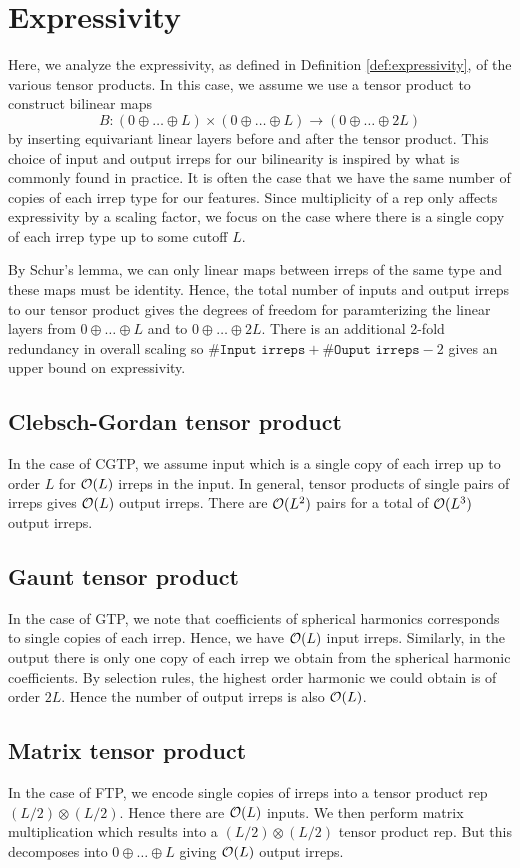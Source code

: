 \section{Expressivity}
\label{sec:expressivity}

Here, we analyze the expressivity, as defined in Definition \ref{def:expressivity}, of the various tensor products. In this case, we assume we use a tensor product to construct bilinear maps 
\[B:(0\oplus\ldots\oplus L)\times (0\oplus\ldots\oplus L)\to (0\oplus\ldots\oplus 2L)\]
by inserting equivariant linear layers before and after the tensor product. This choice of input and output irreps for our bilinearity is inspired by what is commonly found in practice. It is often the case that we have the same number of copies of each irrep type for our features. Since multiplicity of a rep only affects expressivity by a scaling factor, we focus on the case where there is a single copy of each irrep type up to some cutoff $L$.

By Schur's lemma, we can only linear maps between irreps of the same type and these maps must be identity. Hence, the total number of inputs and output irreps to our tensor product gives the degrees of freedom for paramterizing the linear layers from $0\oplus\ldots\oplus L$ and to $0\oplus\ldots\oplus 2L$. There is an additional 2-fold redundancy in overall scaling so $\texttt{\#Input irreps}+\texttt{\#Ouput irreps}-2$ gives an upper bound on expressivity.

\subsection{Clebsch-Gordan tensor product}

In the case of CGTP, we assume input which is a single copy of each irrep up to order $L$ for $\mathcal{O}(L)$ irreps in the input. In general, tensor products of single pairs of irreps gives $\mathcal{O}(L)$ output irreps. There are $\mathcal{O}(L^2)$ pairs for a total of $\mathcal{O}(L^3)$ output irreps.

\subsection{Gaunt tensor product}

In the case of GTP, we note that coefficients of spherical harmonics corresponds to single copies of each irrep. Hence, we have $\mathcal{O}(L)$ input irreps. Similarly, in the output there is only one copy of each irrep we obtain from the spherical harmonic coefficients. By selection rules, the highest order harmonic we could obtain is of order $2L$. Hence the number of output irreps is also $\mathcal{O}(L)$.

\subsection{Matrix tensor product}
In the case of FTP, we encode single copies of irreps into a tensor product rep $(L/2)\otimes (L/2)$. Hence there are $\mathcal{O}(L)$ inputs. We then perform matrix multiplication which results into a $(L/2)\otimes(L/2)$ tensor product rep. But this decomposes into $0\oplus\ldots\oplus L$ giving $\mathcal{O}(L)$ output irreps.
